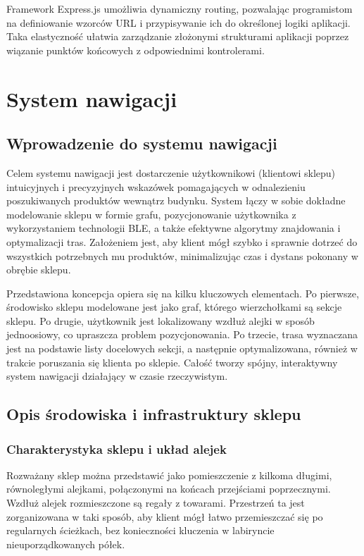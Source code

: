 Framework Express.js umożliwia dynamiczny routing, pozwalając programistom na definiowanie wzorców URL i przypisywanie ich do określonej logiki aplikacji. Taka elastyczność ułatwia zarządzanie złożonymi strukturami aplikacji poprzez wiązanie punktów końcowych z odpowiednimi kontrolerami. \cite{peters2017building}

\section{System nawigacji}

\subsection{Wprowadzenie do systemu nawigacji}
Celem systemu nawigacji jest dostarczenie użytkownikowi (klientowi sklepu) intuicyjnych i precyzyjnych wskazówek pomagających w odnalezieniu poszukiwanych produktów wewnątrz budynku. System łączy w sobie dokładne modelowanie sklepu w formie grafu, pozycjonowanie użytkownika z wykorzystaniem technologii BLE, a także efektywne algorytmy znajdowania i optymalizacji tras. Założeniem jest, aby klient mógł szybko i sprawnie dotrzeć do wszystkich potrzebnych mu produktów, minimalizując czas i dystans pokonany w obrębie sklepu.

Przedstawiona koncepcja opiera się na kilku kluczowych elementach. Po pierwsze, środowisko sklepu modelowane jest jako graf, którego wierzchołkami są sekcje sklepu. Po drugie, użytkownik jest lokalizowany wzdłuż alejki w sposób jednoosiowy, co upraszcza problem pozycjonowania. Po trzecie, trasa wyznaczana jest na podstawie listy docelowych sekcji, a następnie optymalizowana, również w trakcie poruszania się klienta po sklepie. Całość tworzy spójny, interaktywny system nawigacji działający w czasie rzeczywistym.

\subsection{Opis środowiska i infrastruktury sklepu}

\subsubsection{Charakterystyka sklepu i układ alejek}
Rozważany sklep można przedstawić jako pomieszczenie z kilkoma długimi, równoległymi alejkami, połączonymi na końcach przejściami poprzecznymi. Wzdłuż alejek rozmieszczone są regały z towarami. Przestrzeń ta jest zorganizowana w taki sposób, aby klient mógł łatwo przemieszczać się po regularnych ścieżkach, bez konieczności kluczenia w labiryncie nieuporządkowanych półek.

